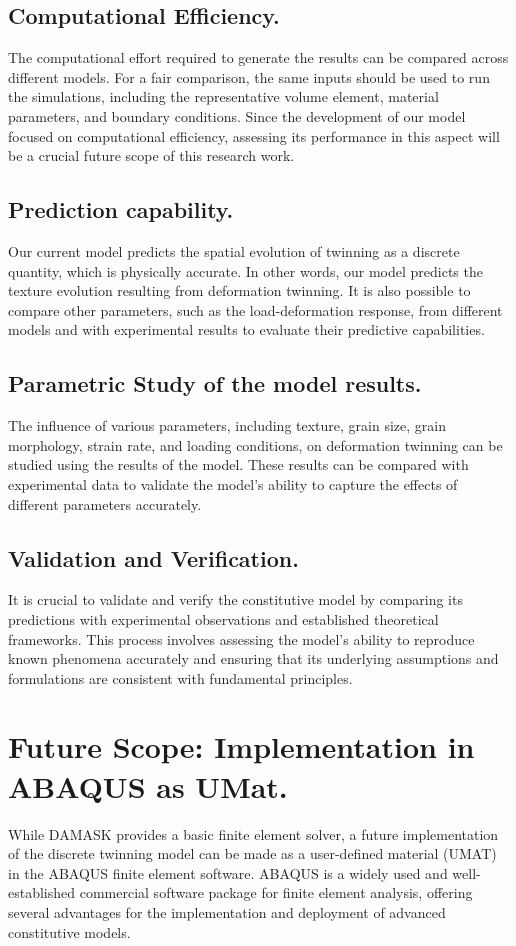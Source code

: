 \subsection{Computational Efficiency.}
The computational effort required to generate the results can be compared across different models. For a fair comparison, the same inputs should be used to run the simulations, including the representative volume element, material parameters, and boundary conditions. Since the development of our model focused on computational efficiency, assessing its performance in this aspect will be a crucial future scope of this research work.

\subsection{Prediction capability.}
Our current model predicts the spatial evolution of twinning as a discrete quantity, which is physically accurate. In other words, our model predicts the texture evolution resulting from deformation twinning. It is also possible to compare other parameters, such as the load-deformation response, from different models and with experimental results to evaluate their predictive capabilities.

\subsection{Parametric Study of the model results.}
The influence of various parameters, including texture, grain size, grain morphology, strain rate, and loading conditions, on deformation twinning can be studied using the results of the model. These results can be compared with experimental data to validate the model's ability to capture the effects of different parameters accurately.

\subsection{Validation and Verification.}
It is crucial to validate and verify the constitutive model by comparing its predictions with experimental observations and established theoretical frameworks. This process involves assessing the model's ability to reproduce known phenomena accurately and ensuring that its underlying assumptions and formulations are consistent with fundamental principles.

\section{Future Scope: Implementation in ABAQUS as UMat.}
While DAMASK provides a basic finite element solver, a future implementation of the discrete twinning model can be made as a user-defined material (UMAT) in the ABAQUS finite element software. ABAQUS is a widely used and well-established commercial software package for finite element analysis, offering several advantages for the implementation and deployment of advanced constitutive models.




